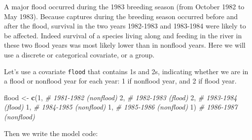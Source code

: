 \documentclass[
  12pt,
]{krantz}
\newenvironment{Shaded}{\begin{snugshade}}{\end{snugshade}}
\newcommand{\CommentTok}[1]{\textcolor[rgb]{0.56,0.35,0.01}{\textit{#1}}}
\newcommand{\DecValTok}[1]{\textcolor[rgb]{0.00,0.00,0.81}{#1}}
\newcommand{\FunctionTok}[1]{\textcolor[rgb]{0.13,0.29,0.53}{\textbf{#1}}}
\newcommand{\NormalTok}[1]{#1}
\newcommand{\OtherTok}[1]{\textcolor[rgb]{0.56,0.35,0.01}{#1}}
\begin{document}
A major flood occurred during the 1983 breeding season (from October 1982 to May 1983). Because captures during the breeding season occurred before and after the flood, survival in the two years 1982-1983 and 1983-1984 were likely to be affected. Indeed survival of a species living along and feeding in the river in these two flood years was most likely lower than in nonflood years. Here we will use a discrete or categorical covariate, or a group.

Let's use a covariate \texttt{flood} that contains 1s and 2s, indicating whether we are in a flood or nonflood year for each year: 1 if nonflood year, and 2 if flood year.

\begin{Shaded}
\begin{Highlighting}[]
\NormalTok{flood }\OtherTok{\textless{}{-}} \FunctionTok{c}\NormalTok{(}\DecValTok{1}\NormalTok{, }\CommentTok{\# 1981{-}1982 (nonflood)}
           \DecValTok{2}\NormalTok{, }\CommentTok{\# 1982{-}1983 (flood)}
           \DecValTok{2}\NormalTok{, }\CommentTok{\# 1983{-}1984 (flood)}
           \DecValTok{1}\NormalTok{, }\CommentTok{\# 1984{-}1985 (nonflood)}
           \DecValTok{1}\NormalTok{, }\CommentTok{\# 1985{-}1986 (nonflood)}
           \DecValTok{1}\NormalTok{) }\CommentTok{\# 1986{-}1987 (nonflood)}
\end{Highlighting}
\end{Shaded}

Then we write the model code:
\end{document}
